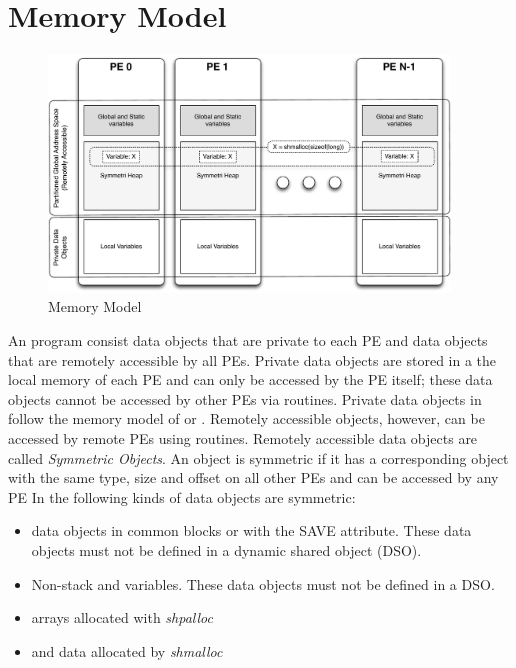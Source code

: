\section{Memory Model}
\begin{figure}[h]
\includegraphics[width=0.95\textwidth]{diagrams/updated/mem_model}      
\caption{\OSH{} Memory Model}                                   
\label{fig:mem_model}                                               
\end{figure}      
An \openshmem program consist data objects that are private to each \ac{PE} and data 
objects that are remotely accessible by all \ac{PE}s. Private data objects are stored in a the local
memory of each \ac{PE} and can only be accessed by the \ac{PE} itself; these data objects
cannot be accessed by other \ac{PE}s via \openshmem routines. Private data objects in \openshmem 
follow the memory model of \Clang{} or \Fortran{}. Remotely accessible
objects, however, can be accessed by remote \ac{PE}s using \openshmem routines.
Remotely accessible data objects are called \emph{Symmetric Objects}.
An object is symmetric if it has a corresponding object with the same
type, size and offset on all other \ac{PE}s and can be accessed by any \ac{PE}
In \openshmem{} the following kinds of data objects are symmetric:
\begin{itemize}
  \item \Fortran{} data objects in common blocks or with the  SAVE  attribute. These data objects	must not be defined in a dynamic shared object (DSO).
  \item Non-stack \Clang{} and \Cpp{} variables.   These  data	objects must  not  be defined in a DSO.
  \item \Fortran{} arrays allocated with \textit{shpalloc} 
  \item \Clang{} and \Cpp{} data allocated by \textit{shmalloc}
\end{itemize}       

